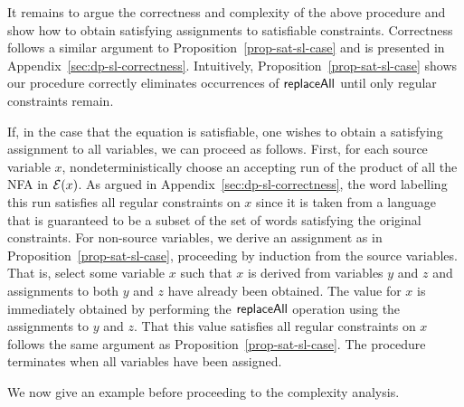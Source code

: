 It remains to argue the correctness and complexity of the above procedure and show how to obtain satisfying assignments to satisfiable constraints.
Correctness follows a similar argument to Proposition~\ref{prop-sat-sl-case} and is presented in Appendix~\ref{sec:dp-sl-correctness}.
Intuitively, Proposition~\ref{prop-sat-sl-case} shows our procedure correctly eliminates occurrences of $\mathsf{replaceAll}$ until only regular constraints remain.

If, in the case that the equation  is satisfiable, one wishes to obtain a satisfying assignment to all variables, we can proceed as follows.
First, for each source variable $x$, nondeterministically choose an accepting run of the product of all the NFA in $\mathcal{E}(x)$.
As argued in Appendix~\ref{sec:dp-sl-correctness}, the word labelling this run satisfies all regular constraints on $x$ since it is taken from a language that is guaranteed to be a subset of the set of words satisfying the original constraints.
For non-source variables, we derive an assignment as in Proposition~\ref{prop-sat-sl-case}, proceeding by induction from the source variables.
That is, select some variable $x$ such that $x$ is derived from variables $y$ and $z$ and assignments to both $y$ and $z$ have already been obtained.
The value for $x$ is immediately obtained by performing the $\mathsf{replaceAll}$ operation using the assignments to $y$ and $z$.
That this value satisfies all regular constraints on $x$ follows the same argument as Proposition~\ref{prop-sat-sl-case}.
The procedure terminates when all variables have been assigned.

We now give an example before proceeding to the complexity analysis.

